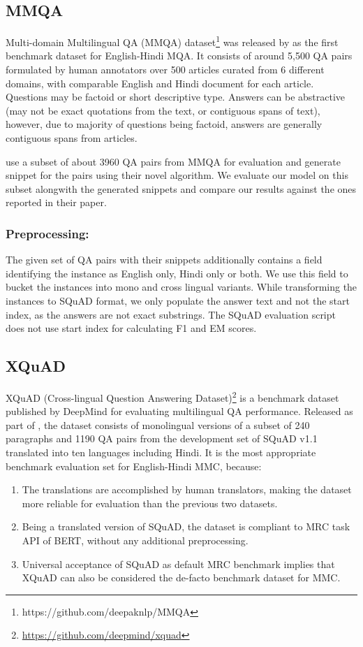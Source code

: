 \documentclass[acmsmall]{acmart}
\begin{document}
\subsection{MMQA}
\label{mmqa_sec}
Multi-domain Multilingual QA (MMQA) dataset\footnote{https://github.com/deepaknlp/MMQA} was released by \cite{mmqa} as the first benchmark dataset for English-Hindi MQA. It consists of around 5,500 QA pairs formulated by human annotators over 500 articles curated from 6 different domains, with comparable English and Hindi document for each article. Questions may be factoid or short descriptive type. Answers can be abstractive (may not be exact quotations from the text, or contiguous spans of text), however,  due to majority of questions being factoid, answers are generally contiguous spans from articles. 
\par \cite{latestMQA} use a subset of about 3960 QA pairs from MMQA for evaluation and generate snippet for the pairs using their novel algorithm. We evaluate our model on this subset alongwith the generated snippets and compare our results against the ones reported in their paper. 
\subsubsection{Preprocessing:} The given set of QA pairs with their snippets additionally contains a field identifying the instance as English only, Hindi only or both. We use this field to bucket the instances into mono and cross lingual variants. While transforming the instances to SQuAD format, we only populate the answer text and not the start index, as the answers are not exact substrings. The SQuAD evaluation script does not use start index for calculating F1 and EM scores. 

\subsection{XQuAD}
\label{xquadsec}
\par XQuAD (Cross-lingual Question Answering Dataset)\footnote{\label{xquad_url}\url{https://github.com/deepmind/xquad}} is a benchmark dataset published by DeepMind for evaluating multilingual QA performance. Released as part of \cite{xquad}, the dataset consists of monolingual versions of a subset of 240 paragraphs and 1190 QA pairs from the development set of SQuAD v1.1 \cite{squad} translated into ten languages including Hindi. It is the most appropriate benchmark evaluation set for English-Hindi MMC, because:
\begin{enumerate}
    \item The translations are accomplished by human translators, making the dataset more reliable for evaluation than the previous two datasets.
    \item Being a translated version of SQuAD, the dataset is compliant to MRC task API of BERT, without any additional preprocessing.
    \item Universal acceptance of SQuAD as default MRC benchmark implies that XQuAD can also be considered the de-facto benchmark dataset for MMC.
\end{enumerate}  
\end{document}
